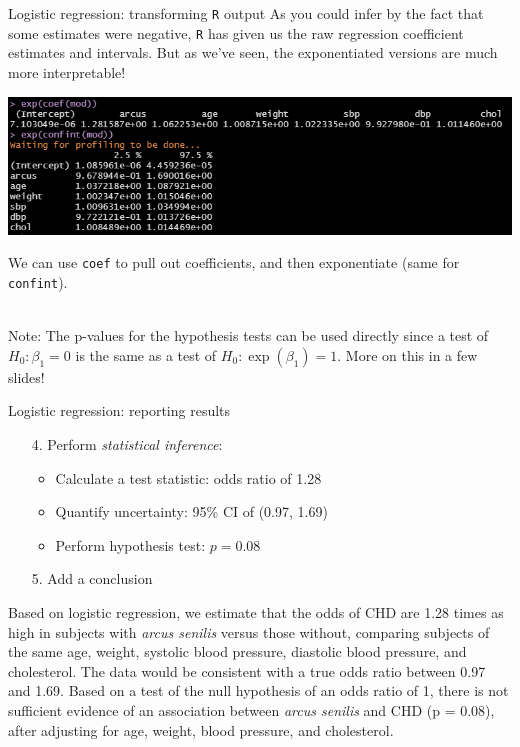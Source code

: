 \documentclass[10pt,t]{beamer}
\begin{document}
\begin{frame}{Logistic regression: transforming \texttt{R} output}
	\vspace{-0.7cm}
	As you could infer by the fact that some estimates were negative, \texttt{R} has given us the raw regression coefficient estimates and intervals. But as we've seen, the exponentiated versions are much more interpretable!
			\begin{center}
		\includegraphics[width=\textwidth]{./figs/multiple_logistic_regression_arcus_exp}
	\end{center}
	We can use \texttt{coef} to pull out coefficients, and then exponentiate (same for \texttt{confint}).
	\\ ~\
	
	Note: The p-values for the hypothesis tests can be used directly since a test of $H_0: \beta_1 = 0$ is the same as a test of $H_0: \exp(\beta_1) = 1$. More on this in a few slides!
\end{frame}

\begin{frame}{Logistic regression: reporting results}
	\begin{enumerate}
		\item[4.] Perform \textit{statistical inference}:
		\begin{itemize}
			\item Calculate a test statistic: odds ratio of 1.28
			\item Quantify uncertainty: 95\% CI of (0.97, 1.69)
			\item Perform hypothesis test: $p = 0.08$
		\end{itemize}
		\item[5.] Add a conclusion
	\end{enumerate}
	Based on logistic regression, we estimate that the odds of CHD are 1.28 times as high in subjects with \textit{arcus senilis} versus those without, comparing subjects of the same age, weight, systolic blood pressure, diastolic blood pressure, and cholesterol. The data would be consistent with a true odds ratio between 0.97 and 1.69. Based on a test of the null hypothesis of an odds ratio of 1, there is not sufficient evidence of an association between \textit{arcus senilis} and CHD (p = 0.08), after adjusting for age, weight, blood pressure, and cholesterol. 
\end{frame}
\end{document}

